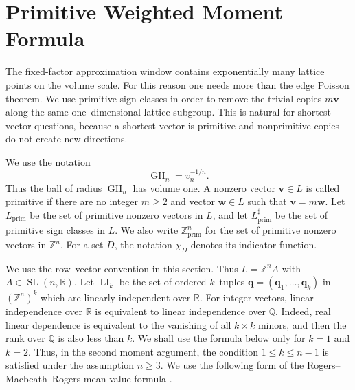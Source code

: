\documentclass[a4paper,12pt]{article}
\theoremstyle{definition}
\theoremstyle{remark}
\newcommand{\re}{\mathbb R}
\newcommand{\ze}{\mathbb Z}
\newcommand{\SL}{\operatorname{SL}}
\newcommand{\GH}{\operatorname{GH}}
\newcommand{\LI}{\operatorname{LI}}
\newcommand{\prim}{\operatorname{prim}}
\begin{document}
\section{Primitive Weighted Moment Formula}
\label{sec:primitive}

The fixed-factor approximation window contains exponentially many lattice points on the volume scale.
For this reason one needs more than the edge Poisson theorem.
We use primitive sign classes in order to remove the trivial copies $m\bm v$ along the same one--dimensional lattice subgroup.
This is natural for shortest-vector questions, because a shortest vector is primitive and nonprimitive copies do not create new directions.

We use the notation
$$
\GH_n=v_n^{-1/n}.
$$
Thus the ball of radius $\GH_n$ has volume one.
A nonzero vector $\bm v\in L$ is called primitive if there are no integer $m\ge2$ and vector $\bm w\in L$ such that $\bm v=m\bm w$.
Let $L_{\prim}$ be the set of primitive nonzero vectors in $L$, and let $L_{\prim}^\sharp$ be the set of primitive sign classes in $L$.
We also write $\ze^n_{\prim}$ for the set of primitive nonzero vectors in $\ze^n$.
For a set $D$, the notation $\chi_D$ denotes its indicator function.

We use the row--vector convention in this section.
Thus $L=\ze^n A$ with $A\in\SL(n,\re)$.
Let $\LI_k$ be the set of ordered $k$--tuples $\bm q=(\bm q_1,\ldots,\bm q_k)$ in $(\ze^n)^k$ which are linearly independent over $\re$.
For integer vectors, linear independence over $\re$ is equivalent to linear
independence over $\mathbb Q$.
Indeed, real linear dependence is equivalent to the vanishing of all
$k\times k$ minors, and then the rank over $\mathbb Q$ is also less than $k$.
We shall use the formula below only for $k=1$ and $k=2$.
Thus, in the second moment argument, the condition $1\le k\le n-1$ is satisfied
under the assumption $n\ge3$.
We use the following form of the Rogers--Macbeath--Rogers mean value formula
\cite{Rogers55Mean,Rogers55Moments,MacbeathRogersI,MacbeathRogersII}.
\end{document}
